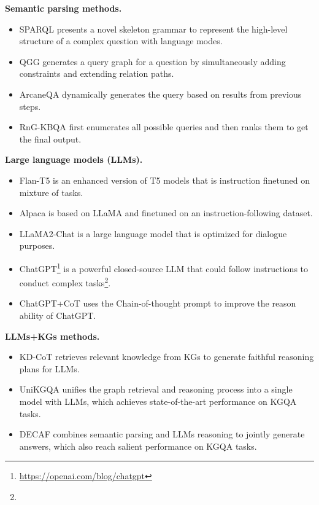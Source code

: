 \noindent\textbf{Semantic parsing methods.}
\begin{itemize}
    \item SPARQL \citep{sun2020sparqa} presents a novel skeleton grammar to represent the high-level structure of a complex question with language modes.
    \item QGG \citep{lan2020query} generates a query graph for a question by simultaneously adding constraints and extending relation paths.
    \item ArcaneQA \citep{gu2022arcaneqa} dynamically generates the query based on results from previous steps.
    \item RnG-KBQA \citep{ye2022rng} first enumerates all possible queries and then ranks them to get the final output.
\end{itemize}

\noindent\textbf{Large language models (LLMs).}
\begin{itemize}
    \item Flan-T5 \citep{chung2022scaling} is an enhanced version of T5 models that is instruction finetuned on mixture of tasks.
    \item Alpaca \citep{taoristanford} is based on LLaMA and finetuned on an instruction-following dataset.
    \item LLaMA2-Chat \citep{touvron2023llama} is a large language model that is optimized for dialogue purposes.
    \item ChatGPT\footnote{\url{https://openai.com/blog/chatgpt}} is a powerful closed-source LLM that could follow instructions to conduct complex tasks\footnote{}.
    \item ChatGPT+CoT \citep{wei2022chain} uses the Chain-of-thought prompt to improve the reason ability of ChatGPT.
\end{itemize}

\noindent\textbf{LLMs+KGs methods.}
\begin{itemize}
    \item KD-CoT \cite{wang2023knowledge} retrieves relevant knowledge from KGs to generate faithful reasoning plans for LLMs.
    \item UniKGQA \citep{jiang2022unikgqa} unifies the graph retrieval and reasoning process into a single model with LLMs, which achieves state-of-the-art performance on KGQA tasks.
    \item DECAF \citep{yu2022decaf} combines semantic parsing and LLMs reasoning to jointly generate answers, which also reach salient performance on KGQA tasks.
\end{itemize}

